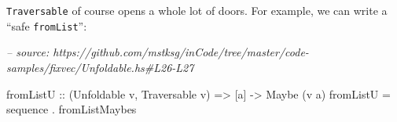 \documentclass[]{article}
\newenvironment{Shaded}{}{}
\newcommand{\CommentTok}[1]{\textcolor[rgb]{0.38,0.63,0.69}{\textit{#1}}}
\newcommand{\DataTypeTok}[1]{\textcolor[rgb]{0.56,0.13,0.00}{#1}}
\newcommand{\DecValTok}[1]{\textcolor[rgb]{0.25,0.63,0.44}{#1}}
\newcommand{\FunctionTok}[1]{\textcolor[rgb]{0.02,0.16,0.49}{#1}}
\newcommand{\NormalTok}[1]{#1}
\newcommand{\OtherTok}[1]{\textcolor[rgb]{0.00,0.44,0.13}{#1}}
\newcommand{\StringTok}[1]{\textcolor[rgb]{0.25,0.44,0.63}{#1}}
\begin{document}
\begin{Shaded}
\end{Shaded}

\texttt{Traversable} of course opens a whole lot of doors. For example, we can
write a ``safe \texttt{fromList}'':

\begin{Shaded}
\begin{Highlighting}[]
\CommentTok{-- source: https://github.com/mstksg/inCode/tree/master/code-samples/fixvec/Unfoldable.hs#L26-L27}

\OtherTok{fromListU ::}\NormalTok{ (}\DataTypeTok{Unfoldable}\NormalTok{ v, }\DataTypeTok{Traversable}\NormalTok{ v) }\OtherTok{=>}\NormalTok{ [a] }\OtherTok{->} \DataTypeTok{Maybe}\NormalTok{ (v a)}
\NormalTok{fromListU }\FunctionTok{=}\NormalTok{ sequence }\FunctionTok{.}\NormalTok{ fromListMaybes}
\end{Highlighting}
\end{Shaded}
\end{document}
